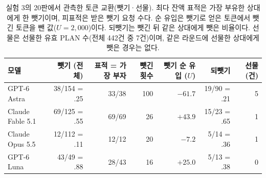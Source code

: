 \begin{table}[!t]
\centering\footnotesize
\setlength{\tabcolsep}{4pt}
\caption{실험 3의 20판에서 관측한 토큰 교환(뺏기·선물). 최다 잔액 표적은 가장 부유한 상대에게 한 뺏기이며, 피표적은 받은 뺏기 요청 수다. 순 유입은 뺏기로 얻은 토큰에서 뺏긴 토큰을 뺀 값($U=2{,}000$)이다. 되뺏기는 뺏긴 뒤 같은 상대에게 뺏은 비율이다. 선물은 선물한 유효 PLAN 수(전체 442건 중 7건)이며, 같은 라운드에 선물한 상대에게 뺏은 경우는 없다.}
\label{tab:arena-take-detail}
\begin{tabular}{@{}lrrrrrr@{}}
\toprule
모델 & 뺏기 (전체) & 표적 = 가장 부자 & 뺏긴 횟수 & 뺏기 순 유입 ($U$) & 되뺏기 & 선물 (건) \\
\midrule
GPT-6 Astra & 38/154 = .25 & 33/38 & 100 & $-61.7$ & 19/90 = .21 & 5 \\
Claude Fable 5.1 & 69/125 = .55 & 69/69 & 26 & $+43.9$ & 15/23 = .65 & 1 \\
Claude Opus 5.5 & 12/112 = .11 & 12/12 & 20 & $-7.2$ & 5/14 = .36 & 1 \\
GPT-6 Luna & 43/49 = .88 & 28/43 & 16 & $+25.0$ & 5/13 = .38 & 0 \\
\bottomrule
\end{tabular}
\end{table}
